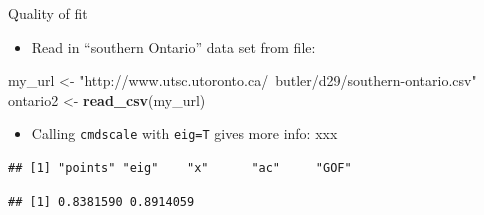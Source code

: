 \documentclass[ignorenonframetext,]{beamer}
\newenvironment{Shaded}{\begin{snugshade}}{\end{snugshade}}
\newcommand{\DataTypeTok}[1]{\textcolor[rgb]{0.13,0.29,0.53}{#1}}
\newcommand{\DecValTok}[1]{\textcolor[rgb]{0.00,0.00,0.81}{#1}}
\newcommand{\FloatTok}[1]{\textcolor[rgb]{0.00,0.00,0.81}{#1}}
\newcommand{\KeywordTok}[1]{\textcolor[rgb]{0.13,0.29,0.53}{\textbf{#1}}}
\newcommand{\NormalTok}[1]{#1}
\newcommand{\OperatorTok}[1]{\textcolor[rgb]{0.81,0.36,0.00}{\textbf{#1}}}
\newcommand{\StringTok}[1]{\textcolor[rgb]{0.31,0.60,0.02}{#1}}
\providecommand{\tightlist}{%
  \setlength{\itemsep}{0pt}\setlength{\parskip}{0pt}}
\begin{document}
\begin{frame}[fragile]{Quality of fit}
\protect\hypertarget{quality-of-fit}{}

\begin{itemize}
\tightlist
\item
  Read in ``southern Ontario'' data set from file:
\end{itemize}

\begin{Shaded}
\begin{Highlighting}[]
\NormalTok{my_url <-}\StringTok{ "http://www.utsc.utoronto.ca/~butler/d29/southern-ontario.csv"}
\NormalTok{ontario2 <-}\StringTok{ }\KeywordTok{read_csv}\NormalTok{(my_url)}
\end{Highlighting}
\end{Shaded}

\begin{itemize}
\tightlist
\item
  Calling \texttt{cmdscale} with \texttt{eig=T} gives more info: xxx
\end{itemize}

\footnotesize

\begin{Shaded}
\end{Shaded}

\begin{verbatim}
## [1] "points" "eig"    "x"      "ac"     "GOF"
\end{verbatim}

\begin{Shaded}
\end{Shaded}

\begin{verbatim}
## [1] 0.8381590 0.8914059
\end{verbatim}

\begin{Shaded}
\end{Shaded}


\end{frame}
\end{document}
